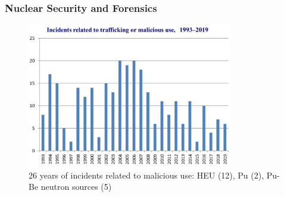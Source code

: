 \begin{frame}
  \frametitle{Nuclear Security and Forensics}
  \begin{figure}
    \centering
    \includegraphics[width=0.8\textwidth]{./figures/nucleartrafficking.png}
    \caption{26 years of incidents related to malicious use: HEU (12), Pu (2), Pu-Be neutron sources (5)\cite{itdb}}
  \end{figure}
\end{frame}

